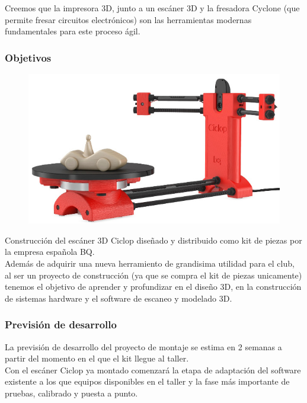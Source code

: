 \documentclass[12pt,twoside]{report}
\begin{document}
Creemos que la impresora 3D, junto a un escáner 3D y la fresadora Cyclone (que permite fresar circuitos electrónicos) son las herramientas modernas fundamentales para este proceso ágil.

\subsubsection{Objetivos}


\begin{figure}\centering
    \includegraphics[scale=0.4]{fotos/bq-ciclop-1}
    \caption*{}
\end{figure}

Construcción del escáner 3D Ciclop diseñado y distribuido como kit de piezas por la empresa española BQ.\\
Además de adquirir una nueva herramiento de grandisima utilidad para el club, al ser un proyecto de construcción (ya que se compra el kit de piezas unicamente) tenemos el objetivo de aprender y profundizar en el diseño 3D, en la construcción de sistemas hardware y el software de escaneo y modelado 3D.

\subsubsection{Previsión de desarrollo}
La previsión de desarrollo del proyecto de montaje se estima en 2 semanas a partir del momento en el que el kit llegue al taller.\\
Con el escáner Ciclop ya montado comenzará la etapa de adaptación del software existente a los que equipos disponibles en el taller y la fase más importante de pruebas, calibrado y puesta a punto.
\end{document}
